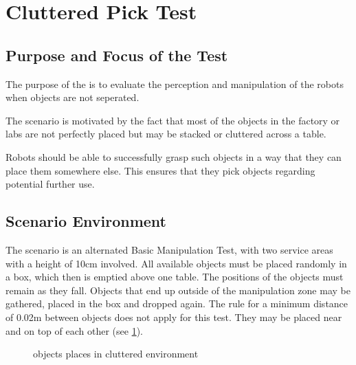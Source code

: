 \newpage
\section{Cluttered Pick Test}

\subsection{Purpose and Focus of the Test}

The purpose of the  is to evaluate the perception
and manipulation of the robots when objects are not seperated.

The scenario is motivated by the fact that most of the objects in the factory or 
labs are not perfectly placed but may be stacked or cluttered across a table.

Robots should be able to successfully grasp such objects in a way that they can place them somewhere else.
This ensures that they pick objects regarding potential further use.

\subsection{Scenario Environment}

The scenario is an alternated Basic Manipulation Test, with two service areas with a height of 10cm involved.
All available objects must be placed randomly in a box, which then is emptied above one table. The positions of the objects must remain as they fall. Objects that end up outside of the manipulation zone may be gathered, placed in the box and dropped again. The rule for a minimum distance of 0.02m between objects does not apply for this test. They may be placed near and on top of each other (see \ref{fig:clutter}).

\begin{figure} [h!]
\begin{center}
 \hspace{1cm}
\end{center}
\caption{objects places in cluttered environment}
\label{fig:clutter}
\end{figure} 



